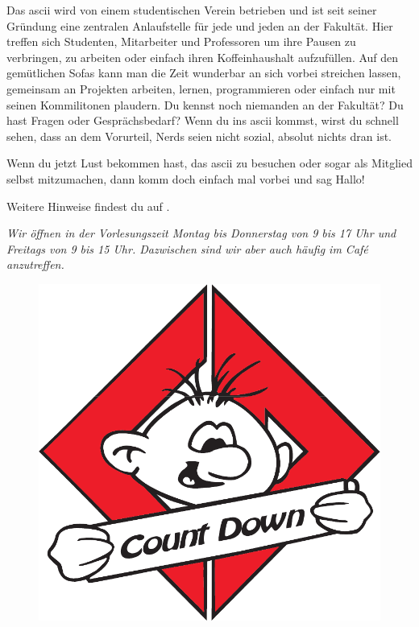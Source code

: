 Das ascii wird von einem studentischen Verein betrieben und ist seit seiner Gründung eine zentralen Anlaufstelle für jede und jeden an der Fakultät.
Hier treffen sich Studenten, Mitarbeiter und Professoren um ihre Pausen zu verbringen,
zu arbeiten oder einfach ihren Koffeinhaushalt aufzufüllen.
Auf den gemütlichen Sofas kann man die Zeit wunderbar an sich vorbei streichen lassen,
gemeinsam an Projekten arbeiten, lernen, programmieren oder einfach nur mit seinen Kommilitonen plaudern.
Du kennst noch niemanden an der Fakultät?
Du hast Fragen oder Gesprächsbedarf?
Wenn du ins ascii kommst, wirst du schnell sehen, dass an dem Vorurteil, Nerds seien nicht sozial, absolut nichts dran ist.

Wenn du jetzt Lust bekommen hast, das ascii zu besuchen oder sogar als Mitglied selbst mitzumachen, dann komm doch einfach mal vorbei und sag Hallo!

Weitere Hinweise findest du auf .

\textit{Wir öffnen in der Vorlesungszeit Montag bis Donnerstag von 9 bis 17 Uhr und Freitags von 9 bis 15 Uhr. Dazwischen sind wir aber auch häufig im Café anzutreffen.}


\begin{figure}%
  \vspace{-.5cm}
  \includegraphics[width=\linewidth]{img/countdown}
  \vspace{-1cm}
\end{figure}

